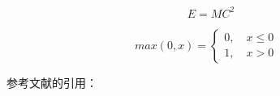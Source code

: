 \documentclass[10pt, conference, compsocconf]{IEEEtran}
\begin{document}
\begin{CJK}{UTF8}{gbsn}
\begin{equation}
  E= MC^2
\end{equation}


\begin{equation}
max(0,x)=\left\{
\begin{aligned}
0, \quad x \leq 0 & \\
1, \quad x > 0  &
\end{aligned}
\right.
\end{equation}

参考文献的引用：
\cite{yearbook2005china}

 
   



\end{CJK}
\end{document}

